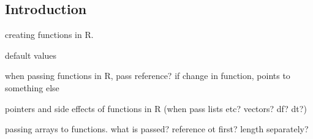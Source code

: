 
\subsection{Introduction}

creating functions in R.

default values

when passing functions in R, pass reference? if change in function, points to something else

pointers and side effects of functions in R (when pass lists etc? vectors? df? dt?)

passing arrays to functions. what is passed? reference ot first? length separately?

